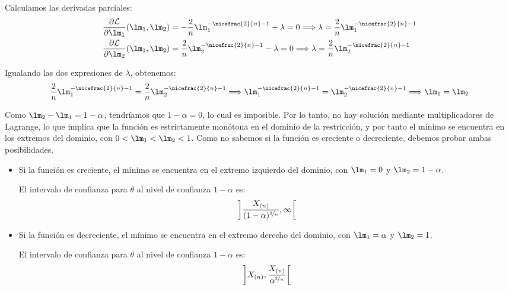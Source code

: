 \begin{ejercicio}[de Examen]
\begin{enumerate}
\begin{description}
            Calculamos las derivadas parciales:
            \begin{align*}
                \frac{\partial \cc{L}}{\partial \lm_1}(\lm_1, \lm_2) &= -\frac{2}{n}\lm_1^{-\nicefrac{2}{n}-1} + \lambda = 0 \Longrightarrow \lambda = \frac{2}{n}\lm_1^{-\nicefrac{2}{n}-1}\\
                \frac{\partial \cc{L}}{\partial \lm_2}(\lm_1, \lm_2) &= \frac{2}{n}\lm_2^{-\nicefrac{2}{n}-1} - \lambda = 0 \Longrightarrow \lambda = \frac{2}{n}\lm_2^{-\nicefrac{2}{n}-1}
            \end{align*}

            Igualando las dos expresiones de $\lambda$, obtenemos:
            \begin{align*}
                \frac{2}{n}\lm_1^{-\nicefrac{2}{n}-1} = \frac{2}{n}\lm_2^{-\nicefrac{2}{n}-1} \Longrightarrow \lm_1^{-\nicefrac{2}{n}-1} = \lm_2^{-\nicefrac{2}{n}-1} \Longrightarrow \lm_1 = \lm_2
            \end{align*}

            Como $\lm_2 - \lm_1 = 1 - \alpha$, tendríamos que $1-\alpha = 0$, lo cual es imposible. Por lo tanto, no hay solución mediante multiplicadores de Lagrange, lo que implica que la función es estrictamente monótona en el dominio de la restricción, y por tanto el mínimo se encuentra en los extremos del dominio, con $0 < \lm_1 < \lm_2 < 1$. Como no sabemos si la función es creciente o decreciente, debemos probar ambas posibilidades.
            \begin{itemize}
                \item Si la función es creciente, el mínimo se encuentra en el extremo izquierdo del dominio, con $\lm_1 = 0$ y $\lm_2 = 1 - \alpha$.
                
                El intervalo de confianza para $\theta$ al nivel de confianza $1 - \alpha$ es:
                \begin{align*}
                    \left]\dfrac{X_{(n)}}{(1 - \alpha)^{\nicefrac{2}{n}}}, \infty\right[
                \end{align*}

                \item Si la función es decreciente, el mínimo se encuentra en el extremo derecho del dominio, con $\lm_1 = \alpha$ y $\lm_2 = 1$.
                
                El intervalo de confianza para $\theta$ al nivel de confianza $1 - \alpha$ es:
                \begin{align*}
                    \left]X_{(n)}, \dfrac{X_{(n)}}{\alpha^{\nicefrac{2}{n}}}\right[
                \end{align*}
            \end{itemize}


\end{description}
\end{enumerate}
\end{ejercicio}

